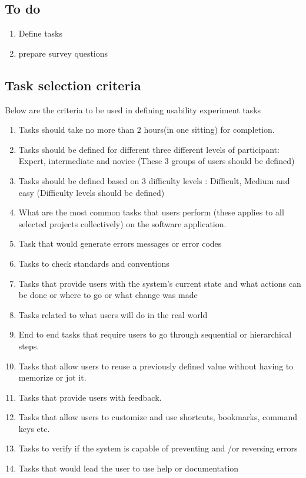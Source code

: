 \documentclass[letterpaper,cleveref]{lipics-v2019}
\theoremstyle{definition}
\begin{document}
\subsection{To do}
\begin {enumerate}
 \item Define tasks
 \item prepare survey questions
 \end {enumerate}
 
\subsection{Task selection criteria}
Below are the criteria to be used in defining usability experiment tasks
\begin {enumerate}
\item Tasks should take no more than 2 hours(in one sitting) for completion.
\item Tasks should be defined for different three different levels of participant: Expert, intermediate and novice (These 3 groups of users should be defined)
\item Tasks should be defined based on 3 difficulty levels : Difficult, Medium and easy (Difficulty levels should be defined) 
\item What are the most common tasks that users perform (these applies to all selected projects collectively) on the software application.
\item Task that would generate errors messages or error codes
\item Tasks to check standards and conventions
\item Tasks that provide users with the system's current state and what actions can be done or where to go or what change was made
\item Tasks related to what users will do in the real world
\item End to end tasks that require users to go through sequential or hierarchical steps.
\item Tasks that allow users to reuse a previously defined value without having to memorize or jot it.
\item Tasks that provide users with feedback.
\item Tasks that allow users to customize and use shortcuts, bookmarks, command keys etc.
\item Tasks to verify if the system is capable of preventing and /or reversing errors
\item Tasks that would lead the user to use help or documentation

\end {enumerate} 
\end{document}
